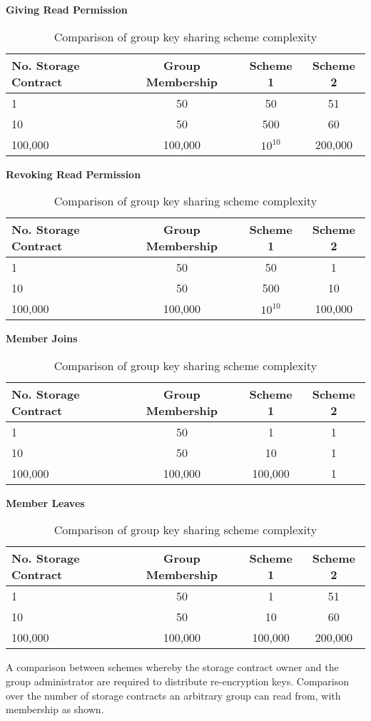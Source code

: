 \begin{table}[H]
  \centering

  \textbf{Giving Read Permission} \\
  \begin{tabular}{ | l | c | c | c | }
    \hline
    No. Storage Contract & Group Membership & Scheme 1 & Scheme 2 \\
    \hline
    1 & 50 & 50 & 51 \\
    10 & 50 & 500 & 60 \\
    100,000 & 100,000 & $10^{10}$ & 200,000 \\
    \hline
  \end{tabular}

  \vspace{5mm}

  \textbf{Revoking Read Permission} \\
  \begin{tabular}{ | l | c | c | c | }
    \hline
    No. Storage Contract & Group Membership & Scheme 1 & Scheme 2 \\
    \hline
    1 & 50 & 50 & 1 \\
    10 & 50 & 500 & 10 \\
    100,000 & 100,000 & $10^{10}$ & 100,000 \\
    \hline
  \end{tabular}

  \vspace{5mm}

  \textbf{Member Joins} \\
  \begin{tabular}{ | l | c | c | c | }
    \hline
    No. Storage Contract & Group Membership & Scheme 1 & Scheme 2 \\
    \hline
    1 & 50 & 1 & 1 \\
    10 & 50 & 10 & 1 \\
    100,000 & 100,000 & 100,000 & 1 \\
    \hline
  \end{tabular}

  \vspace{5mm}

  \textbf{Member Leaves} \\
  \begin{tabular}{ | l | c | c | c | }
    \hline
    No. Storage Contract & Group Membership & Scheme 1 & Scheme 2 \\
    \hline
    1 & 50 & 1 & 51 \\
    10 & 50 & 10 & 60 \\
    100,000 & 100,000 & 100,000 & 200,000 \\
    \hline
  \end{tabular}

  \caption{
    Comparison of group key sharing scheme complexity
  }{
    A comparison between schemes whereby the storage contract owner and the group administrator are required to distribute re-encryption keys. Comparison over the number of storage contracts an arbitrary group can read from, with membership as shown.
  }
  \label{table:group_key_sharing_scheme_comparison}
\end{table}

